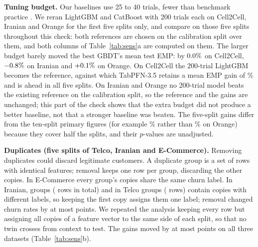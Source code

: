 \documentclass[11pt]{article}
\begin{document}
\textbf{Tuning budget.} Our baselines use 25 to 40 trials, fewer than benchmark practice \cite{erickson2025tabarena}.
We reran LightGBM and CatBoost with 200 trials each on Cell2Cell, Iranian and Orange for the first five splits only,
and compare on those five splits throughout this check: both references are chosen on the calibration split over them,
and both columns of Table~\ref{tab:sens}a are computed on them. The larger budget barely moved the best GBDT's mean test EMP: by $0.0\%$ on Cell2Cell,
$-0.8\%$ on Iranian and $+0.1\%$ on Orange. On Cell2Cell the
200-trial LightGBM becomes the reference, against which TabPFN-3.5 retains a mean EMP gain of
\strongPFNThreeCellTwoCellAbs\% and is ahead in all five splits. On Iranian and Orange no 200-trial model beats the existing reference on the calibration split, so the
reference and the gains are unchanged; this part of the check shows that the extra budget did not produce a better
baseline, not that a stronger baseline was beaten. The five-split gains differ from the ten-split primary figures
(for example \strongPFNThreeOrangeAbs\% rather than \empPFNThreeOrangeAbs\% on Orange) because they cover half the
splits, and their $p$-values are unadjusted.

\textbf{Duplicates (five splits of Telco, Iranian and E-Commerce).} Removing duplicates could discard legitimate
customers. A duplicate group is a set of rows with identical
features; removal keeps one row per group, discarding the other copies. In E-Commerce every group's copies share the
same churn label. In Iranian, \conflictGroupsIranian{} groups (\conflictRowsIranian{} rows in total) and in Telco
\conflictGroupsTelco{} groups (\conflictRowsTelco{} rows) contain copies with different labels, so keeping the first
copy assigns them one label; removal changed churn rates by at most
\maxChurnShift{} points. We repeated the analysis keeping every row but assigning all copies of a feature vector to the same side of
each split, so that no twin crosses from context to test. The gains moved by at most \maxDupShift{} points on all three datasets
(Table~\ref{tab:sens}b).
\end{document}
